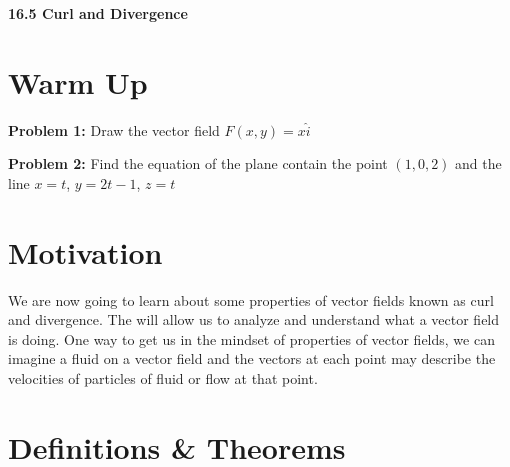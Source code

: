 \documentclass[11pt]{article}
\newcommand{\vs}{\vspace*{.1in}}
\begin{document}
\begin{LARGE}\begin{center}\bf 16.5 Curl and Divergence\end{center}
\end{LARGE}

\vs\vs



\section{Warm Up}
\textbf{Problem 1:} Draw the vector field $F(x,y) = x \hat{i}$

\textbf{Problem 2:} Find the equation of the plane contain the point $(1,0,2)$ and the line $x = t$, $y=2t-1$, $z= t$


\section{Motivation}
We are now going to learn about some properties of vector fields known as curl and divergence. The will allow us to analyze and understand what a vector field is doing. One way to get us in the mindset of properties of vector fields, we can imagine a fluid on a vector field and the vectors at each point may describe the velocities of particles of fluid or flow at that point.



\section{Definitions \& Theorems}
\end{document}

